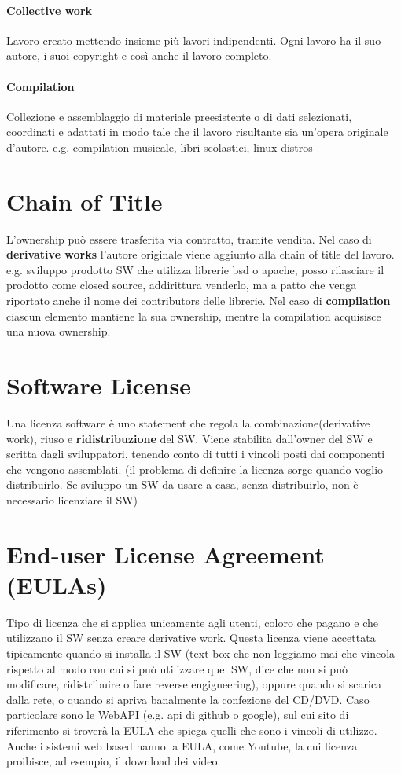 \documentclass[10pt,a4paper]{book}
\begin{document}
\paragraph{Collective work} Lavoro creato mettendo insieme più lavori indipendenti. Ogni lavoro ha il suo autore, i suoi copyright e così anche il lavoro completo. 

\paragraph{Compilation} Collezione e assemblaggio di materiale preesistente o di dati selezionati, coordinati e adattati in modo tale che il lavoro risultante sia un'opera originale d'autore.
e.g. compilation musicale, libri scolastici, linux distros

\section{Chain of Title}
L'ownership può essere trasferita via contratto, tramite vendita.
Nel caso di \textbf{derivative works} l'autore originale viene aggiunto alla chain of title del lavoro. e.g. sviluppo prodotto SW che utilizza librerie bsd o apache, posso rilasciare il prodotto come closed source, addirittura venderlo, ma a patto che venga riportato anche il nome dei contributors delle librerie.
Nel caso di \textbf{compilation} ciascun elemento mantiene la sua ownership, mentre la compilation acquisisce una nuova ownership.

\section{Software License}
Una licenza software è uno statement che regola la combinazione(derivative work), riuso e \textbf{ridistribuzione} del SW.
Viene stabilita dall'owner del SW e scritta dagli sviluppatori, tenendo conto di tutti i vincoli posti dai componenti che vengono assemblati.
(il problema di definire la licenza sorge quando voglio distribuirlo. Se sviluppo un SW da usare a casa, senza distribuirlo, non è necessario licenziare il SW)

\section{End-user License Agreement (EULAs)}
Tipo di licenza che si applica unicamente agli utenti, coloro che pagano e che utilizzano il SW senza creare derivative work.
Questa licenza viene accettata tipicamente quando si installa il SW (text box che non leggiamo mai che vincola rispetto al modo con cui si può utilizzare quel SW, dice che non si può modificare, ridistribuire o fare reverse engigneering), oppure quando si scarica dalla rete, o quando si apriva banalmente la confezione del CD/DVD.
Caso particolare sono le WebAPI (e.g. api di github o google), sul cui sito di riferimento si troverà la EULA che spiega quelli che sono i vincoli di utilizzo.
Anche i sistemi web based hanno la EULA, come Youtube, la cui licenza proibisce, ad esempio, il download dei video.
\end{document}
